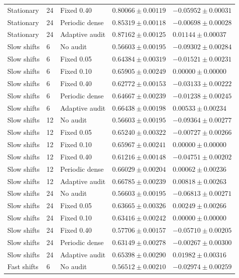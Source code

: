 \begin{longtable}{@{}lllll@{}}
Stationary & 24 & Fixed 0.40 & $0.80066 \pm 0.00119$ & $-0.05952 \pm 0.00031$ \\
Stationary & 24 & Periodic dense & $0.85319 \pm 0.00118$ & $-0.00698 \pm 0.00028$ \\
Stationary & 24 & Adaptive audit & $0.87162 \pm 0.00125$ & $0.01144 \pm 0.00037$ \\
Slow shifts & 6 & No audit & $0.56603 \pm 0.00195$ & $-0.09302 \pm 0.00284$ \\
Slow shifts & 6 & Fixed 0.05 & $0.64384 \pm 0.00319$ & $-0.01521 \pm 0.00231$ \\
Slow shifts & 6 & Fixed 0.10 & $0.65905 \pm 0.00249$ & $0.00000 \pm 0.00000$ \\
Slow shifts & 6 & Fixed 0.40 & $0.62772 \pm 0.00153$ & $-0.03133 \pm 0.00222$ \\
Slow shifts & 6 & Periodic dense & $0.64667 \pm 0.00239$ & $-0.01238 \pm 0.00245$ \\
Slow shifts & 6 & Adaptive audit & $0.66438 \pm 0.00198$ & $0.00533 \pm 0.00234$ \\
Slow shifts & 12 & No audit & $0.56603 \pm 0.00195$ & $-0.09364 \pm 0.00277$ \\
Slow shifts & 12 & Fixed 0.05 & $0.65240 \pm 0.00322$ & $-0.00727 \pm 0.00266$ \\
Slow shifts & 12 & Fixed 0.10 & $0.65967 \pm 0.00241$ & $0.00000 \pm 0.00000$ \\
Slow shifts & 12 & Fixed 0.40 & $0.61216 \pm 0.00148$ & $-0.04751 \pm 0.00202$ \\
Slow shifts & 12 & Periodic dense & $0.66029 \pm 0.00204$ & $0.00062 \pm 0.00236$ \\
Slow shifts & 12 & Adaptive audit & $0.66785 \pm 0.00239$ & $0.00818 \pm 0.00263$ \\
Slow shifts & 24 & No audit & $0.56603 \pm 0.00195$ & $-0.06813 \pm 0.00271$ \\
Slow shifts & 24 & Fixed 0.05 & $0.63665 \pm 0.00326$ & $0.00249 \pm 0.00266$ \\
Slow shifts & 24 & Fixed 0.10 & $0.63416 \pm 0.00242$ & $0.00000 \pm 0.00000$ \\
Slow shifts & 24 & Fixed 0.40 & $0.57706 \pm 0.00157$ & $-0.05710 \pm 0.00205$ \\
Slow shifts & 24 & Periodic dense & $0.63149 \pm 0.00278$ & $-0.00267 \pm 0.00300$ \\
Slow shifts & 24 & Adaptive audit & $0.65398 \pm 0.00290$ & $0.01982 \pm 0.00316$ \\
Fast shifts & 6 & No audit & $0.56512 \pm 0.00210$ & $-0.02974 \pm 0.00259$ \\

\end{longtable}
